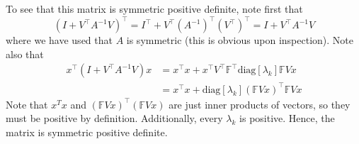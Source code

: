 \documentclass[reqno]{article}
\begin{document}
	To see that this matrix is symmetric positive definite, note first that
	\begin{equation}
		(I + V^\top A^{-1} V)^\top = I^\top + V^\top (A^{-1})^\top (V^\top)^\top = I + V^\top A^{-1} V
	\end{equation}
	where we have used that $A$ is symmetric (this is obvious upon inspection). Note also that
	\begin{equation}
	\begin{split}
		x^\top (I + V^\top A^{-1} V)x &= x^\top x + x^\top V^\top \mathbb{F}^\top \text{diag}[\lambda_k] \mathbb{F} V x \\
		&= x^\top x + \text{diag}[\lambda_k](\mathbb{F} V x)^\top \mathbb{F} V x
	\end{split}
	\end{equation}
	Note that $x^T x$ and $(\mathbb{F}V x)^\top (\mathbb{F} Vx)$ are just inner products of vectors, so they must be positive by definition. Additionally, every $\lambda_k$ is positive. Hence, the matrix is symmetric positive definite. 
	
\end{document}
